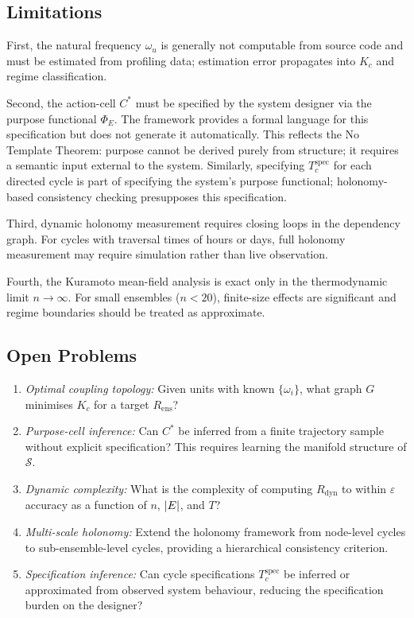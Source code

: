 \documentclass[twocolumn,a4paper,11pt]{article}
\theoremstyle{plain}
\theoremstyle{definition}
\theoremstyle{remark}
\DeclarePairedDelimiter{\abs}{\lvert}{\rvert}
\begin{document}
\subsection{Limitations}

First, the natural frequency $\omega_u$ is generally not computable from
source code and must be estimated from profiling data; estimation error
propagates into $K_c$ and regime classification.

Second, the action-cell $C^*$ must be specified by the system designer
via the purpose functional $\Phi_E$. The framework provides a formal
language for this specification but does not generate it automatically.
This reflects the No Template Theorem: purpose cannot be derived purely
from structure; it requires a semantic input external to the system.
Similarly, specifying $T_c^{\mathrm{spec}}$ for each directed cycle is
part of specifying the system's purpose functional; holonomy-based
consistency checking presupposes this specification.

Third, dynamic holonomy measurement requires closing loops in the
dependency graph. For cycles with traversal times of hours or days,
full holonomy measurement may require simulation rather than live
observation.

Fourth, the Kuramoto mean-field analysis is exact only in the
thermodynamic limit $n \to \infty$. For small ensembles ($n < 20$),
finite-size effects are significant and regime boundaries should be
treated as approximate.

\subsection{Open Problems}

\begin{enumerate}[leftmargin=*]
  \item \textit{Optimal coupling topology:} Given units with known
        $\{\omega_i\}$, what graph $G$ minimises $K_c$ for a target
        $R_\mathrm{ens}$?
  \item \textit{Purpose-cell inference:} Can $C^*$ be inferred from a
        finite trajectory sample without explicit specification? This
        requires learning the manifold structure of $\mathcal{S}$.
  \item \textit{Dynamic complexity:} What is the complexity of computing
        $R_\mathrm{dyn}$ to within $\varepsilon$ accuracy as a function
        of $n$, $\abs{E}$, and $T$?
  \item \textit{Multi-scale holonomy:} Extend the holonomy framework from
        node-level cycles to sub-ensemble-level cycles, providing a
        hierarchical consistency criterion.
  \item \textit{Specification inference:} Can cycle specifications
        $T_c^{\mathrm{spec}}$ be inferred or approximated from observed
        system behaviour, reducing the specification burden on the designer?
\end{enumerate}
\end{document}
